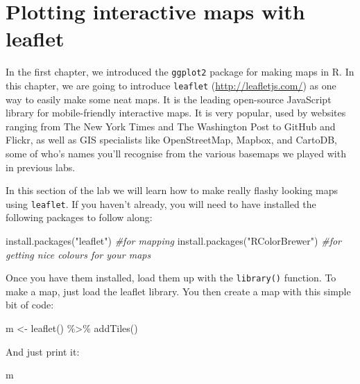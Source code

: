\documentclass[
]{book}
\newenvironment{Shaded}{\begin{snugshade}}{\end{snugshade}}
\newcommand{\CommentTok}[1]{\textcolor[rgb]{0.56,0.35,0.01}{\textit{#1}}}
\newcommand{\FunctionTok}[1]{\textcolor[rgb]{0.00,0.00,0.00}{#1}}
\newcommand{\NormalTok}[1]{#1}
\newcommand{\OtherTok}[1]{\textcolor[rgb]{0.56,0.35,0.01}{#1}}
\newcommand{\SpecialCharTok}[1]{\textcolor[rgb]{0.00,0.00,0.00}{#1}}
\newcommand{\StringTok}[1]{\textcolor[rgb]{0.31,0.60,0.02}{#1}}
\begin{document}
\hypertarget{plotting-interactive-maps-with-leaflet}{%
\section{Plotting interactive maps with leaflet}\label{plotting-interactive-maps-with-leaflet}}

In the first chapter, we introduced the \texttt{ggplot2} package for making maps in R. In this chapter, we are going to introduce \texttt{leaflet} (\url{http://leafletjs.com/}) as one way to easily make some neat maps. It is the leading open-source JavaScript library for mobile-friendly interactive maps. It is very popular, used by websites ranging from The New York Times and The Washington Post to GitHub and Flickr, as well as GIS specialists like OpenStreetMap, Mapbox, and CartoDB, some of who's names you'll recognise from the various basemaps we played with in previous labs.

In this section of the lab we will learn how to make really flashy looking maps using \texttt{leaflet}. If you haven't already, you will need to have installed the following packages to follow along:

\begin{Shaded}
\begin{Highlighting}[]
\FunctionTok{install.packages}\NormalTok{(}\StringTok{"leaflet"}\NormalTok{) }\CommentTok{\#for mapping}
\FunctionTok{install.packages}\NormalTok{(}\StringTok{"RColorBrewer"}\NormalTok{) }\CommentTok{\#for getting nice colours for your maps}
\end{Highlighting}
\end{Shaded}

Once you have them installed, load them up with the \texttt{library()} function. To make a map, just load the leaflet library. You then create a map with this simple bit of code:

\begin{Shaded}
\begin{Highlighting}[]
\NormalTok{m }\OtherTok{\textless{}{-}} \FunctionTok{leaflet}\NormalTok{() }\SpecialCharTok{\%\textgreater{}\%}
  \FunctionTok{addTiles}\NormalTok{()  }
\end{Highlighting}
\end{Shaded}

And just print it:

\begin{Shaded}
\begin{Highlighting}[]
\NormalTok{m  }
\end{Highlighting}
\end{Shaded}
\end{document}
